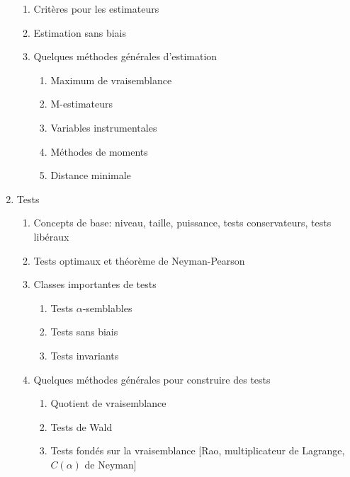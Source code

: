 \documentclass[titlepage,11pt,amstex]{article}
\begin{document}
\begin{enumerate}
\begin{enumerate}
\item Crit\`{e}res pour les estimateurs

\item Estimation sans biais

\item Quelques m\'{e}thodes g\'{e}n\'{e}rales d'estimation

\begin{enumerate}
\item Maximum de vraisemblance

\item M-estimateurs

\item Variables instrumentales

\item M\'{e}thodes de moments

\item Distance minimale
\end{enumerate}
\end{enumerate}

\item \label{Testing}Tests

\begin{enumerate}
\item Concepts de base: niveau, taille, puissance, tests conservateurs,
tests lib\'{e}raux

\item Tests optimaux et th\'{e}or\`{e}me de Neyman-Pearson

\item Classes importantes de tests

\begin{enumerate}
\item Tests $\alpha $-semblables

\item Tests sans biais

\item Tests invariants
\end{enumerate}

\item Quelques m\'{e}thodes g\'{e}n\'{e}rales pour construire des tests

\begin{enumerate}
\item Quotient de vraisemblance

\item Tests de Wald

\item Tests fond\'{e}s sur la vraisemblance [Rao, multiplicateur de
Lagrange, $C(\alpha )$ de Neyman]


\end{enumerate}
\end{enumerate}
\end{enumerate}
\end{document}
